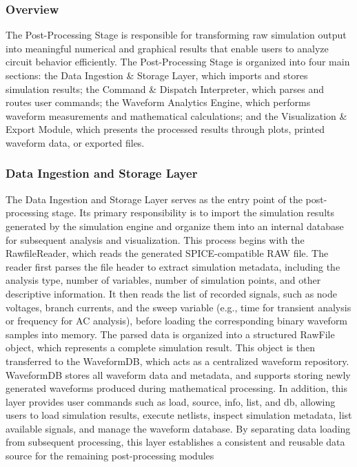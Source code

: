 \subsubsection{Overview}
The Post-Processing Stage is responsible for transforming raw simulation output into meaningful numerical and graphical results that enable users to analyze circuit behavior efficiently.
The Post-Processing Stage is organized into four main sections: the Data Ingestion \& Storage Layer, which imports and stores simulation results; the Command \& Dispatch Interpreter, which parses and routes user commands; the Waveform Analytics Engine, which performs waveform measurements and mathematical calculations; and the Visualization \& Export Module, which presents the processed results through plots, printed waveform data, or exported files.
\subsubsection{Data Ingestion and Storage Layer}
The Data Ingestion and Storage Layer serves as the entry point of the post-processing stage. Its primary responsibility is to import the simulation results generated by the simulation engine and organize them into an internal database for subsequent analysis and visualization. This process begins with the RawfileReader, which reads the generated SPICE-compatible RAW file. The reader first parses the file header to extract simulation metadata, including the analysis type, number of variables, number of simulation points, and other descriptive information. It then reads the list of recorded signals, such as node voltages, branch currents, and the sweep variable (e.g., time for transient analysis or frequency for AC analysis), before loading the corresponding binary waveform samples into memory. The parsed data is organized into a structured RawFile object, which represents a complete simulation result. This object is then transferred to the WaveformDB, which acts as a centralized waveform repository. WaveformDB stores all waveform data and metadata, and supports storing newly generated waveforms produced during mathematical processing. In addition, this layer provides user commands such as load, source, info, list, and db, allowing users to load simulation results, execute netlists, inspect simulation metadata, list available signals, and manage the waveform database. By separating data loading from subsequent processing, this layer establishes a consistent and reusable data source for the remaining post-processing modules

